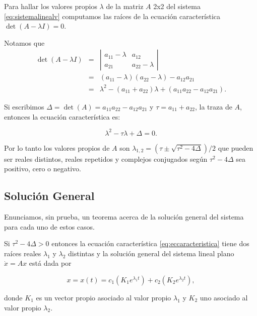 Para hallar los valores propios $\lambda$ de la matriz $A$ 2x2 del sistema \ref{eq:sistemalinealv} computamos las raíces de la ecuación característica $\det(A - \lambda I) = 0$.

Notamos que
\begin{eqnarray*}
	\det(A - \lambda I) & = &  \left| \begin{array}{ll} a_{11} - \lambda & a_{12} \\ a_{21} & a_{22} - \lambda \end{array} \right| \\ 
	& = & (a_{11} - \lambda)(a_{22} - \lambda) - a_{12}a_{21} \\
	& = & \lambda^2 - (a_{11} + a_{22})\lambda + (a_{11}a_{22} - a_{12}a_{21}).
\end{eqnarray*}

Si escribimos $\Delta = \det(A) = a_{11}a_{22} - a_{12}a_{21}$ y $\tau = a_{11} + a_{22}$, la traza de $A$, entonces la ecuación característica es:

\begin{equation} \label{eq:eccaracteristica}
	\lambda^2 - \tau \lambda + \Delta = 0.
\end{equation}

Por lo tanto los valores propios de $A$ son $\lambda_{1,2} = (\tau \pm \sqrt{\tau^2 - 4\Delta}) / 2 $ que pueden ser reales distintos, reales repetidos y complejos conjugados según $\tau^2 - 4\Delta$ sea positivo, cero o negativo.

\subsection{Solución General} \label{subsec:soluciongeneral}

Enunciamos, sin prueba, un teorema acerca de la solución general del sistema para cada uno de estos casos.

\begin{theorem}Si $\tau^2 - 4\Delta > 0$ entonces la ecuación característica \ref{eq:eccaracteristica} tiene dos raíces reales $\lambda_1$ y $\lambda_2$ distintas y la solución general del sistema lineal plano $\dot{x} = Ax$ está dada por

\begin{equation} \label{eq:solvlrspropiosdistintos}
x = x(t) = c_1(K_1 e^{\lambda_1 t}) + c_2(K_2 e^{\lambda_2 t}),
\end{equation}

donde $K_1$ es un vector propio asociado al valor propio $\lambda_1$ y $K_2$ uno asociado al valor propio $\lambda_2$.
\end{theorem}


